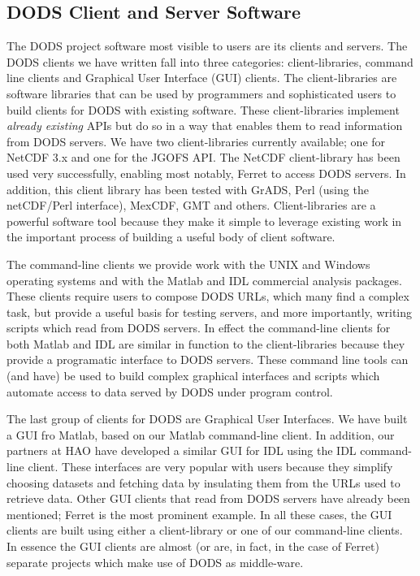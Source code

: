 \documentclass[10pt]{article}
\begin{document}
\subsection{DODS Client and Server Software}
\label{sec:c-s}

The DODS project software most visible to users are its clients and servers.
The DODS clients we have written fall into three categories:
client-libraries, command line clients and Graphical User Interface (GUI)
clients.  The client-libraries are software libraries that can be used by
programmers and sophisticated users to build clients for DODS with existing
software.  These client-libraries implement \emph{already existing} APIs but
do so in a way that enables them to read information from DODS servers. We
have two client-libraries currently available; one for NetCDF 3.x and one for
the JGOFS API. The NetCDF client-library has been used very successfully,
enabling most notably, Ferret\cite{Ferret} to access DODS servers. In
addition, this client library has been tested with GrADS, Perl (using the
netCDF/Perl interface), MexCDF, GMT and others. Client-libraries are a
powerful software tool because they make it simple to leverage existing work
in the important process of building a useful body of client software.

The command-line clients we provide work with the UNIX and Windows operating
systems and with the Matlab and IDL commercial analysis packages. These
clients require users to compose DODS URLs, which many find a complex task,
but provide a useful basis for testing servers, and more importantly, writing
scripts which read from DODS servers. In effect the command-line clients for
both Matlab and IDL are similar in function to the client-libraries because
they provide a programatic interface to DODS servers. These command line
tools can (and have) be used to build complex graphical interfaces and
scripts which automate access to data served by DODS under program control.

The last group of clients for DODS are Graphical User Interfaces. We have
built a GUI fro Matlab, based on our Matlab command-line client. In addition,
our partners at HAO have developed a similar GUI for IDL using the IDL
command-line client. These interfaces are very popular with users because
they simplify choosing datasets and fetching data by insulating them from the
URLs used to retrieve data. Other GUI clients that read from DODS servers
have already been mentioned; Ferret is the most prominent example. In all
these cases, the GUI clients are built using either a client-library or one
of our command-line clients. In essence the GUI clients are almost (or are,
in fact, in the case of Ferret) separate projects which make use of DODS
as middle-ware.
\end{document}
